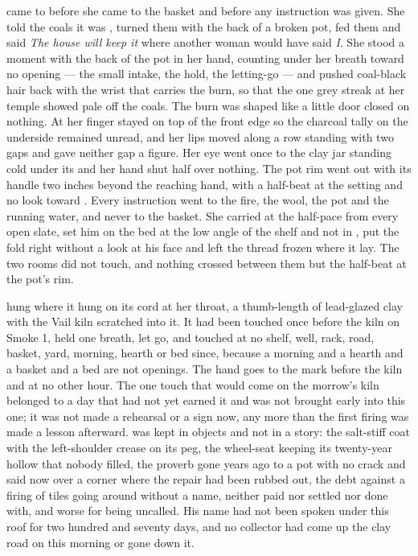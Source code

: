 \scenebreak

 came to  before she came to the basket and before any instruction was given. She told the coals it was , turned them with the back of a broken pot, fed them and said \emph{The house will keep it} where another woman would have said \emph{I}. She stood a moment with the back of the pot in her hand, counting under her breath toward no opening --- the small intake, the hold, the letting-go --- and pushed coal-black hair back with the wrist that carries the burn, so that the one grey streak at her temple showed pale off the coals. The burn was shaped like a little door closed on nothing. At  her finger stayed on top of the front edge so the charcoal tally on the underside remained unread, and her lips moved along a row standing with two gaps and gave neither gap a figure. Her eye went once to the clay jar standing cold under its  and her hand shut half over nothing. The pot rim went out with its handle two inches beyond the reaching hand, with a half-beat at the setting and no look toward . Every instruction went to the fire, the wool, the pot and the running water, and never to the basket. She carried at the half-pace from every open slate, set him on the bed at the low angle of the shelf and not in , put the fold right without a look at his face and left the thread frozen where it lay. The two rooms did not touch, and nothing crossed between them but the half-beat at the pot's rim.

 hung where it hung on its cord at her throat, a thumb-length of lead-glazed clay with the Vail kiln scratched into it. It had been touched once before the kiln on Smoke 1, held one breath, let go, and touched at no shelf, well, rack, road, basket, yard, morning, hearth or bed since, because a morning and a hearth and a basket and a bed are not openings. The hand goes to the mark before the kiln and at no other hour. The one touch that would come on the morrow's kiln belonged to a day that had not yet earned it and was not brought early into this one; it was not made a rehearsal or a sign now, any more than the first firing was made a lesson afterward.  was kept in objects and not in a story: the salt-stiff coat with the left-shoulder crease on its peg, the wheel-seat keeping its twenty-year hollow that nobody filled, the proverb gone years ago to a pot with no crack and said now over a corner where the repair had been rubbed out, the debt against a firing of tiles going around without a name, neither paid nor settled nor done with, and worse for being uncalled. His name had not been spoken under this roof for two hundred and seventy days, and no collector had come up the clay road on this morning or gone down it.


